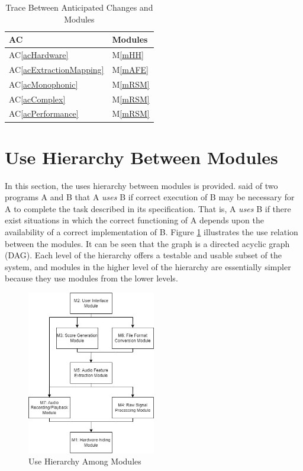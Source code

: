 \documentclass[12pt, titlepage]{article}
\newcommand{\acref}[1]{AC\ref{#1}}
\newcommand{\mref}[1]{M\ref{#1}}
\begin{document}
\begin{table}[H]
\centering
\begin{tabular}{p{} p{}}
\toprule
\textbf{AC} & \textbf{Modules}\\
\midrule
\acref{acHardware} & \mref{mHH}\\
\acref{acExtractionMapping} & \mref{mAFE}\\
\acref{acMonophonic} & \mref{mRSM}\\
\acref{acComplex} & \mref{mRSM}\\
\acref{acPerformance} & \mref{mRSM}\\
\bottomrule
\end{tabular}
\caption{Trace Between Anticipated Changes and Modules}
\label{TblACT}
\end{table}

\section{Use Hierarchy Between Modules} \label{SecUse}

In this section, the uses hierarchy between modules is
provided. \citet{Parnas1978} said of two programs A and B that A {\em uses} B if
correct execution of B may be necessary for A to complete the task described in
its specification. That is, A {\em uses} B if there exist situations in which
the correct functioning of A depends upon the availability of a correct
implementation of B.  Figure \ref{FigUH} illustrates the use relation between
the modules. It can be seen that the graph is a directed acyclic graph
(DAG). Each level of the hierarchy offers a testable and usable subset of the
system, and modules in the higher level of the hierarchy are essentially simpler
because they use modules from the lower levels.

\begin{figure}[H]
\centering
\includegraphics[width=0.5\textwidth]{./images/ModuleGuideUseHierarchy.jpg}
\caption{Use Hierarchy Among Modules}
\label{FigUH}
\end{figure}
\end{document}
